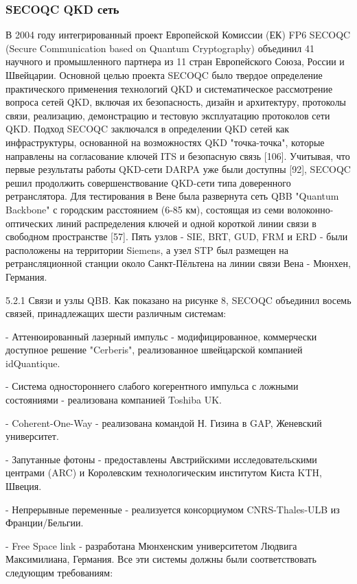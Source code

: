 \subsubsection*{SECOQC QKD сеть}
В 2004 году интегрированный проект Европейской Комиссии (ЕК) FP6 SECOQC (Secure Communication based on Quantum Cryptography) объединил 41 научного и промышленного партнера из 11 стран Европейского Союза, России и Швейцарии. Основной целью проекта SECOQC было твердое определение практического применения технологий QKD и систематическое рассмотрение вопроса сетей QKD, включая их безопасность, дизайн и архитектуру, протоколы связи, реализацию, демонстрацию и тестовую эксплуатацию протоколов сети QKD.
Подход SECOQC заключался в определении QKD сетей как инфраструктуры, основанной на возможностях QKD "точка-точка", которые направлены на согласование ключей ITS и безопасную связь [106]. Учитывая, что первые результаты работы QKD-сети DARPA уже были доступны [92], SECOQC решил продолжить совершенствование QKD-сети типа доверенного ретранслятора. Для тестирования в Вене была развернута сеть QBB "Quantum Backbone" с городским расстоянием (6-85 км), состоящая из семи волоконно-оптических линий распределения ключей и одной короткой линии связи в свободном пространстве [57]. Пять узлов - SIE, BRT, GUD, FRM и ERD - были расположены на территории Siemens, а узел STP был размещен на ретрансляционной станции около Санкт-Пёльтена на линии связи Вена - Мюнхен, Германия.

5.2.1 Связи и узлы QBB. Как показано на рисунке 8, SECOQC объединил восемь связей, принадлежащих шести различным системам:

- Аттенюированный лазерный импульс - модифицированное, коммерчески доступное решение "Cerberis", реализованное швейцарской компанией idQuantique.

- Система одностороннего слабого когерентного импульса с ложными состояниями - реализована компанией Toshiba UK.

- Coherent-One-Way - реализована командой Н. Гизина в GAP, Женевский университет.

- Запутанные фотоны - предоставлены Австрийскими исследовательскими центрами (ARC) и Королевским технологическим институтом Киста KTH, Швеция.

- Непрерывные переменные - реализуется консорциумом CNRS-Thales-ULB из Франции/Бельгии.

- Free Space link - разработана Мюнхенским университетом Людвига Максимилиана, Германия.
Все эти системы должны были соответствовать следующим требованиям:

